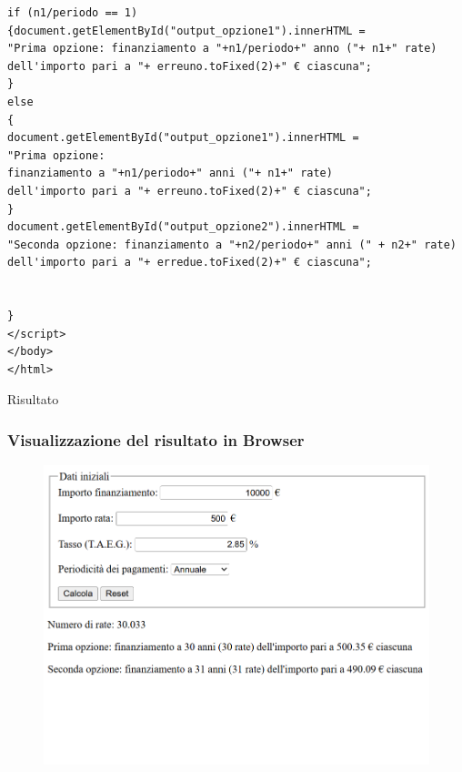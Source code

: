 \documentclass{beamer}
\begin{document}
\begin{frame}[fragile,shrink=20]
\begin{multicols}{2}
\begin{verbatim}
if (n1/periodo == 1)
{document.getElementById("output_opzione1").innerHTML = 
"Prima opzione: finanziamento a "+n1/periodo+" anno ("+ n1+" rate) 
dell'importo pari a "+ erreuno.toFixed(2)+" € ciascuna";
}
else
{
document.getElementById("output_opzione1").innerHTML = 
"Prima opzione: 
finanziamento a "+n1/periodo+" anni ("+ n1+" rate)
dell'importo pari a "+ erreuno.toFixed(2)+" € ciascuna";
}
document.getElementById("output_opzione2").innerHTML =
"Seconda opzione: finanziamento a "+n2/periodo+" anni (" + n2+" rate) 
dell'importo pari a "+ erredue.toFixed(2)+" € ciascuna";


}
</script>
</body>
</html>

        \end{verbatim}
    \end{multicols}
\end{frame}

    \begin{frame}{Risultato}
    \frametitle{Visualizzazione del risultato in Browser}
    \begin{figure}
        \centering
        \includegraphics[width=0.7\linewidth]{Risultato_Finale.png}
    \end{figure}
    \end{frame}

\end{document}
